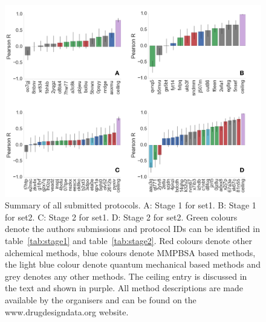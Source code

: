 \documentclass{svjour3}                     %
\begin{document}
\begin{figure}
\includegraphics[width=\textwidth]{Fig5.pdf}
\caption{Summary of all submitted protocols. A:  Stage 1 for set1. B: Stage 1 for set2. C: Stage 2 for set1. D: Stage 2 for set2. Green colours denote the authors submissions and protocol IDs can be identified in table~\ref{tab:stage1} and table~\ref{tab:stage2}. Red colours denote other alchemical methods, blue colours denote MMPBSA based methods, the light blue colour denote quantum mechanical based methods and grey denotes any other methods. The ceiling entry is discussed in the text and shown in purple. All method descriptions are made available by the organisers and can be found on the www.drugdesigndata.org website.}
\label{fig:fig5}
\end{figure} 
\end{document}
